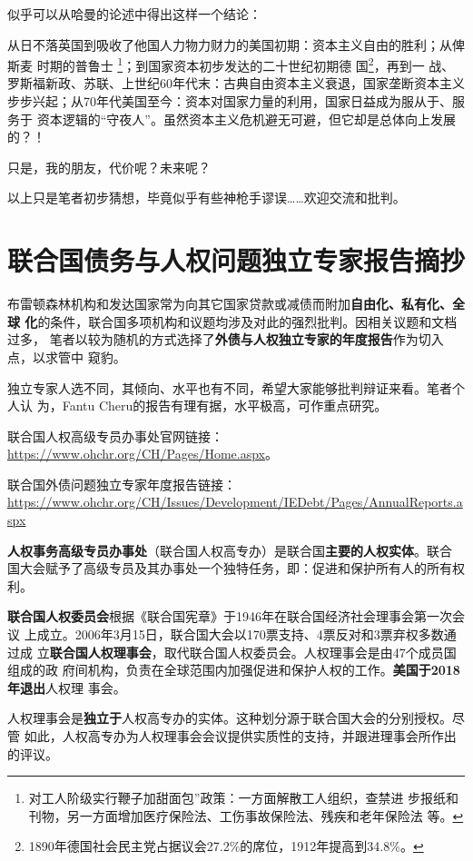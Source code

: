 似乎可以从哈曼的论述中得出这样一个结论：

从日不落英国到吸收了他国人力物力财力的美国初期：资本主义自由的胜利；从俾斯麦
时期的普鲁士 \footnote{对工人阶级实行鞭子加甜面包”政策：一方面解散工人组织，查禁进
  步报纸和刊物，另一方面增加医疗保险法、工伤事故保险法、残疾和老年保险法
  等。}；到国家资本初步发达的二十世纪初期德
国\footnote{1890年德国社会民主党占据议会27.2\%的席位，1912年提高到34.8\%。}，再到一
战、罗斯福新政、苏联、上世纪60年代末：古典自由资本主义衰退，国家垄断资本主义
步步兴起；从70年代美国至今：资本对国家力量的利用，国家日益成为服从于、服务于
资本逻辑的“守夜人”。虽然资本主义危机避无可避，但它却是总体向上发展的？！

只是，我的朋友，代价呢？未来呢？

以上只是笔者初步猜想，毕竟似乎有些神枪手谬误……欢迎交流和批判。


\section[联合国债务与人权独立专家报告]{联合国债务与人权问题独立专家报告摘抄}

布雷顿森林机构和发达国家常为向其它国家贷款或减债而附加\textbf{自由化、私有化、全球
  化}的条件，联合国多项机构和议题均涉及对此的强烈批判。因相关议题和文档过多，
笔者以较为随机的方式选择了\textbf{外债与人权独立专家的年度报告}作为切入点，以求管中
窥豹。

独立专家人选不同，其倾向、水平也有不同，希望大家能够批判辩证来看。笔者个人认
为，Fantu Cheru的报告有理有据，水平极高，可作重点研究。

联合国人权高级专员办事处官网链接：\url{https://www.ohchr.org/CH/Pages/Home.aspx}。

联合国外债问题独立专家年度报告链接：\url{https://www.ohchr.org/CH/Issues/Development/IEDebt/Pages/AnnualReports.aspx}


\textbf{人权事务高级专员办事处}（联合国人权高专办）是联合国\textbf{主要的人权实体}。联合
国大会赋予了高级专员及其办事处一个独特任务，即：促进和保护所有人的所有权利。

\textbf{联合国人权委员会}根据《联合国宪章》于1946年在联合国经济社会理事会第一次会议
上成立。2006年3月15日，联合国大会以170票支持、4票反对和3票弃权多数通过成
立\textbf{联合国人权理事会}，取代联合国人权委员会。人权理事会是由47个成员国组成的政
府间机构，负责在全球范围内加强促进和保护人权的工作。\textbf{美国于2018年退出}人权理
事会。

人权理事会是\textbf{独立于}人权高专办的实体。这种划分源于联合国大会的分别授权。尽管
如此，人权高专办为人权理事会会议提供实质性的支持，并跟进理事会所作出的评议。

